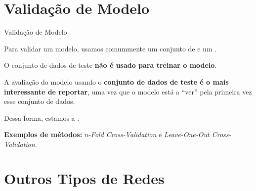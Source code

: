 \section{Validação de Modelo}

\begin{frame}{Validação de Modelo}

    Para validar um modelo, usamos comummente um conjunto de  e um .

    \medskip
    
    O conjunto de dados de teste \textbf{não é usado para treinar o modelo}.

    \pauseskip
    
    A avaliação do modelo usando o \textbf{conjunto de dados de teste é o mais interessante de reportar}, uma vez que o modelo está a \enquote{ver} pela primeira vez esse conjunto de dados.

    \medskip
    
    Dessa forma, estamos a . 
    
    \textbf{Exemplos de métodos:} $n$-\textit{Fold Cross-Validation} e \textit{Leave-One-Out Cross-Validation}. 

\end{frame}

\section{Outros Tipos de Redes}

